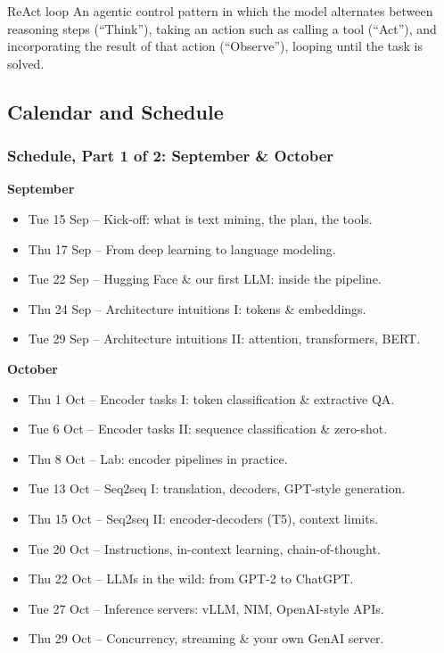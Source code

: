 \begin{defbox}{ReAct loop}
An agentic control pattern in which the model alternates between reasoning steps (``Think''), taking an action such as calling a tool (``Act''), and incorporating the result of that action (``Observe''), looping until the task is solved. 
\end{defbox}

\subsection{Calendar and Schedule }

\subsubsection{Schedule, Part 1 of 2: September \& October}

\textbf{September}
\begin{itemize}
    \item[1.] Tue 15 Sep -- Kick-off: what is text mining, the plan, the tools.
    \item[2.] Thu 17 Sep -- From deep learning to language modeling.
    \item[3.] Tue 22 Sep -- Hugging Face \& our first LLM: inside the pipeline.
    \item[4.] Thu 24 Sep -- Architecture intuitions I: tokens \& embeddings.
    \item[5.] Tue 29 Sep -- Architecture intuitions II: attention, transformers, BERT.
\end{itemize}

\textbf{October}
\begin{itemize}
    \item[6.] Thu 1 Oct -- Encoder tasks I: token classification \& extractive QA.
    \item[7.] Tue 6 Oct -- Encoder tasks II: sequence classification \& zero-shot.
    \item[8.] Thu 8 Oct -- Lab: encoder pipelines in practice.
    \item[9.] Tue 13 Oct -- Seq2seq I: translation, decoders, GPT-style generation.
    \item[10.] Thu 15 Oct -- Seq2seq II: encoder-decoders (T5), context limits.
    \item[11.] Tue 20 Oct -- Instructions, in-context learning, chain-of-thought.
    \item[12.] Thu 22 Oct -- LLMs in the wild: from GPT-2 to ChatGPT.
    \item[13.] Tue 27 Oct -- Inference servers: vLLM, NIM, OpenAI-style APIs.
    \item[14.] Thu 29 Oct -- Concurrency, streaming \& your own GenAI server.
\end{itemize}

